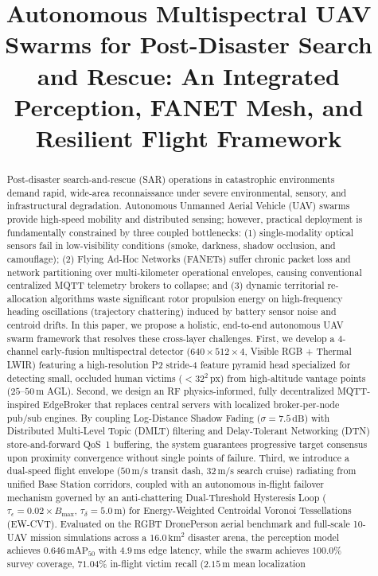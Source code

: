 \documentclass[conference]{IEEEtran}
\begin{document}
\title{Autonomous Multispectral UAV Swarms for Post-Disaster Search and Rescue: An Integrated Perception, FANET Mesh, and Resilient Flight Framework}

\author{
}

\maketitle

\begin{abstract}
Post-disaster search-and-rescue (SAR) operations in catastrophic environments demand rapid, wide-area reconnaissance under severe environmental, sensory, and infrastructural degradation. Autonomous Unmanned Aerial Vehicle (UAV) swarms provide high-speed mobility and distributed sensing; however, practical deployment is fundamentally constrained by three coupled bottlenecks: (1) single-modality optical sensors fail in low-visibility conditions (smoke, darkness, shadow occlusion, and camouflage); (2) Flying Ad-Hoc Networks (FANETs) suffer chronic packet loss and network partitioning over multi-kilometer operational envelopes, causing conventional centralized MQTT telemetry brokers to collapse; and (3) dynamic territorial re-allocation algorithms waste significant rotor propulsion energy on high-frequency heading oscillations (trajectory chattering) induced by battery sensor noise and centroid drifts. In this paper, we propose a holistic, end-to-end autonomous UAV swarm framework that resolves these cross-layer challenges. First, we develop a 4-channel early-fusion multispectral detector ($640 \times 512 \times 4$, Visible RGB + Thermal LWIR) featuring a high-resolution P2 stride-4 feature pyramid head specialized for detecting small, occluded human victims ($<32^2\,\text{px}$) from high-altitude vantage points ($25\text{--}50\,\text{m}$ AGL). Second, we design an RF physics-informed, fully decentralized MQTT-inspired EdgeBroker that replaces central servers with localized broker-per-node pub/sub engines. By coupling Log-Distance Shadow Fading ($\sigma = 7.5\,\text{dB}$) with Distributed Multi-Level Topic (DMLT) filtering and Delay-Tolerant Networking (DTN) store-and-forward QoS~1 buffering, the system guarantees progressive target consensus upon proximity convergence without single points of failure. Third, we introduce a dual-speed flight envelope ($50\,\text{m/s}$ transit dash, $32\,\text{m/s}$ search cruise) radiating from unified Base Station corridors, coupled with an autonomous in-flight failover mechanism governed by an anti-chattering Dual-Threshold Hysteresis Loop ($\tau_\epsilon = 0.02 \times B_{\text{max}}$, $\tau_\delta = 5.0\,\text{m}$) for Energy-Weighted Centroidal Voronoi Tessellations (EW-CVT). Evaluated on the RGBT DronePerson aerial benchmark and full-scale 10-UAV mission simulations across a $16.0\,\text{km}^2$ disaster arena, the perception model achieves $0.646\,\text{mAP}_{50}$ with $4.9\,\text{ms}$ edge latency, while the swarm achieves $100.0\%$ survey coverage, $71.04\%$ in-flight victim recall ($2.15\,\text{m}$ mean localization 
\end{abstract}
\end{document}
